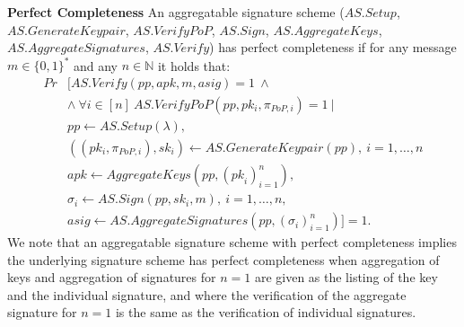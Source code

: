 \noindent \textbf{Perfect Completeness} An aggregatable signature scheme
($\mathit{AS.Setup}$, \\ $\mathit{AS.GenerateKeypair}$, $\mathit{AS.VerifyPoP}$, $\mathit{AS.Sign}$, $\mathit{AS.AggregateKeys}$,\\ 
$\mathit{AS.AggregateSignatures}$, $\mathit{AS.Verify}$) has perfect completeness if for any message $m \in \{0,1\}^*$ and any 
$n\in\mathbb{N}$ it holds that:
\begin{align*}
 \mathit{Pr} & [\mathit{AS.Verify}(\mathit{pp}, \mathit{apk}, m, \mathit{asig})=1 \ \wedge \ \\
 & \wedge \  \forall  i \in [n]\ \mathit{AS.VerifyPoP}(\mathit{pp}, \mathit{pk_i},\mathit{\pi_{\mathit{PoP},i}})=1\ |\\
& \mathit{pp} \leftarrow \mathit{AS.Setup(\lambda)}, \\
& ((pk_{i},\pi_{\mathit{PoP}, i}), sk_{i} ) \leftarrow \mathit{AS.GenerateKeypair}(\mathit{pp}),\ i=1,\ldots,n\\
&  \mathit{apk} \leftarrow \mathit{AggregateKeys}(\mathit{pp}, (\mathit{pk}_{i})_{i=1}^{n}), \\
&  \sigma_i \leftarrow \mathit{AS.Sign}(\mathit{pp}, \mathit{sk_i}, m),\ i=1,\ldots,n, \\
&  \mathit{asig} \leftarrow \mathit{AS.AggregateSignatures(\mathit{pp}, (\sigma_{i})_{i=1}^{n})}] = 1.
\end{align*}
\noindent We note that an aggregatable signature scheme with perfect completeness implies the underlying signature scheme
has perfect completeness when aggregation of keys and aggregation of signatures for $n=1$ are given as the listing of the key and 
the individual signature, and where the verification of the aggregate signature for $n=1$ is the same as the verification of individual signatures. \\

